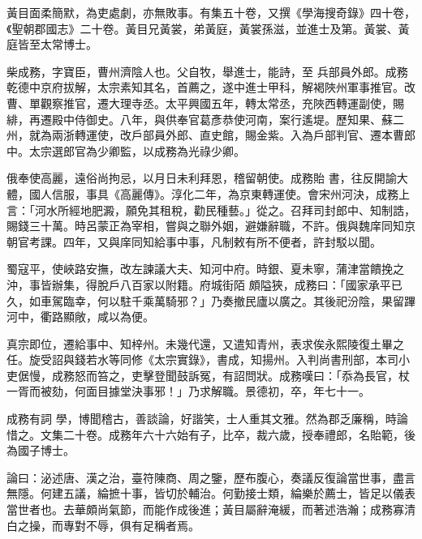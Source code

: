 \begin{pinyinscope}
 黃目面柔簡默，為吏處劇，亦無敗事。有集五十卷，又撰《學海搜奇錄》四十卷，《聖朝郡國志》二十卷。黃目兄黃裳，弟黃庭，黃裳孫滋，並進士及第。黃裳、黃庭皆至太常博士。



 柴成務，字寶臣，曹州濟陰人也。父自牧，舉進士，能詩，至
 兵部員外郎。成務乾德中京府拔解，太宗素知其名，首薦之，遂中進士甲科，解褐陜州軍事推官。改曹、單觀察推官，遷大理寺丞。太平興國五年，轉太常丞，充陜西轉運副使，賜緋，再遷殿中侍御史。八年，與供奉官葛彥恭使河南，案行遙堤。歷知果、蘇二州，就為兩浙轉運使，改戶部員外郎、直史館，賜金紫。入為戶部判官、遷本曹郎中。太宗選郎官為少卿監，以成務為光祿少卿。



 俄奉使高麗，遠俗尚拘忌，以月日未利拜恩，稽留朝使。成務貽
 書，往反開諭大體，國人信服，事具《高麗傳》。淳化二年，為京東轉運使。會宋州河決，成務上言：「河水所經地肥澱，願免其租稅，勸民種藝。」從之。召拜司封郎中、知制誥，賜錢三十萬。時呂蒙正為宰相，嘗與之聯外姻，避嫌辭職，不許。俄與魏庠同知京朝官考課。四年，又與庠同知給事中事，凡制敕有所不便者，許封駁以聞。



 蜀寇平，使峽路安撫，改左諫議大夫、知河中府。時銀、夏未寧，蒲津當饋挽之沖，事皆辦集，得脫戶八百家以附籍。府城街陌
 頗隘狹，成務曰：「國家承平已久，如車駕臨幸，何以駐千乘萬騎邪？」乃奏撤民廬以廣之。其後祀汾陰，果留蹕河中，衢路顯敞，咸以為便。



 真宗即位，遷給事中、知梓州。未幾代還，又遣知青州，表求俟永熙陵復土畢之任。旋受詔與錢若水等同修《太宗實錄》，書成，知揚州。入判尚書刑部，本司小吏倨慢，成務怒而笞之，吏擊登聞鼓訴冤，有詔問狀。成務嘆曰：「忝為長官，杖一胥而被劾，何面目據堂決事邪！」乃求解職。景德初，卒，年七十一。



 成務有詞
 學，博聞稽古，善談論，好諧笑，士人重其文雅。然為郡乏廉稱，時論惜之。文集二十卷。成務年六十六始有子，比卒，裁六歲，授奉禮郎，名貽範，後為國子博士。



 論曰：泌述唐、漢之治，臺符陳商、周之鑒，歷布腹心，奏議反復論當世事，盡言無隱。何建五議，綸摭十事，皆切於輔治。何勤接士類，綸樂於薦士，皆足以儀表當世者也。去華頗尚氣節，而能作成後進；黃目屬辭淹緩，而著述浩瀚；成務寡清白之操，而專對不辱，俱有足稱者焉。



\end{pinyinscope}